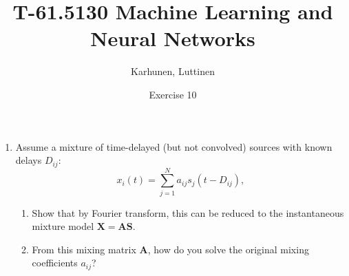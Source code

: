 
\title{T-61.5130 Machine Learning and Neural Networks}
\author{Karhunen, Luttinen}
\date{Exercise 10}

\usepackage{cancel}

\newcommand{\vect}[1]{{\bf{#1}}}
\newcommand{\svect}[1]{\boldsymbol{#1}}
\newcommand{\matr}[1]{\boldsymbol{#1}}




\maketitle

\begin{enumerate}


\item Assume a mixture of time-delayed (but not convolved) sources with known delays $D_{ij}$:
  \begin{displaymath}
    x_i(t) = \sum_{j=1}^N a_{ij}s_j(t-D_{ij}),
  \end{displaymath}
  \begin{enumerate}
  \item Show that by Fourier transform, this can be reduced to the instantaneous mixture
    model $\mathbf{X} = \mathbf{A} \mathbf{S}$.
  \item From this mixing matrix $\mathbf{A}$, how do you solve the original mixing
    coefficients $a_{ij}$?
  \end{enumerate}

  \begin{solution}



\end{solution}
\end{enumerate}
